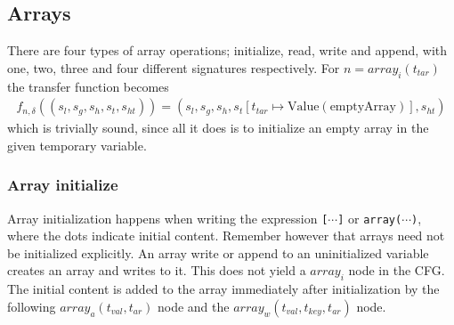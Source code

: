 \subsection{Arrays}

There are four types of array operations; initialize, read, write and append, with one, two, three and four different signatures respectively. For $n = \mathit{array}_i(t_{tar})$ the transfer function becomes
\begin{align}
f_{n,\delta}((s_l, s_g, s_h, s_t, s_{ht})) = (s_l, s_g, s_h, s_t[t_{tar}\mapsto \text{Value}(\text{emptyArray})], s_{ht})
\end{align}
which is trivially sound, since all it does is to initialize an empty array in the given temporary variable.

\subsubsection{Array initialize}
Array initialization happens when writing the expression \texttt{[$\cdots$]} or \texttt{array($\cdots$)}, where the dots indicate initial content. Remember however that arrays need not be initialized explicitly. An array write or append to an uninitialized variable creates an array and writes to it. This does not yield a $\mathit{array}_i$ node in the CFG. The initial content is added to the array immediately after initialization by the following $\mathit{array}_a(t_{val}, t_{ar})$ node and  the $\mathit{array}_w(t_{val}, t_{key}, t_{ar})$ node.

